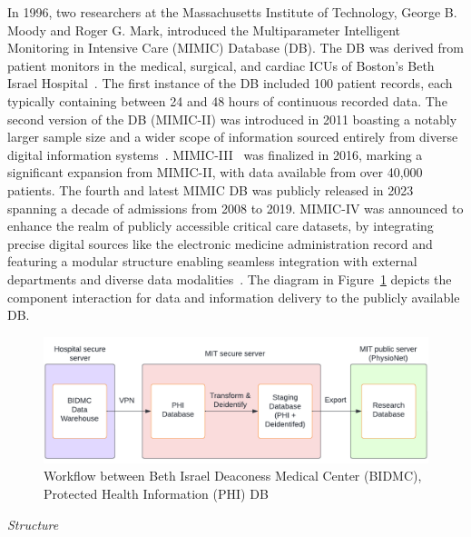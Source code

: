 In 1996, two researchers at the Massachusetts Institute of Technology, George B. Moody and Roger G. Mark, introduced the Multiparameter Intelligent Monitoring in Intensive Care (MIMIC) Database (DB).
The DB was derived from patient monitors in the medical, surgical, and cardiac ICUs of Boston’s Beth Israel Hospital~\cite{moodyDatabaseSupportDevelopment1996}.
The first instance of the DB included 100 patient records, each typically containing between 24 and 48 hours of continuous recorded data.
The second version of the DB (MIMIC-II) was introduced in 2011 boasting a notably larger sample size and a wider scope of information sourced entirely from diverse digital information systems~\cite{saeedMultiparameterIntelligentMonitoring2011}.
MIMIC-III~\cite{johnsonMIMICIIIFreelyAccessible2016} was finalized in 2016, marking a significant expansion from MIMIC-II, with data available from over 40,000 patients.
The fourth and latest MIMIC DB was publicly released in 2023 spanning a decade of admissions from 2008 to 2019.
MIMIC-IV was announced to enhance the realm of publicly accessible critical care datasets, by integrating precise digital sources like the electronic medicine administration record and featuring a modular structure enabling seamless integration with external departments and diverse data modalities~\cite{johnsonMIMICIVFreelyAccessible2023}.
The diagram in Figure~\ref{fig:mimic_workflow} depicts the component interaction for data and information delivery to the publicly available DB\@.

\begin{figure}[h]
    \centering
    \includegraphics[scale=0.6]{images/mimic/mimic_workflow}
    \caption{Workflow between Beth Israel Deaconess Medical Center (BIDMC), Protected Health Information (PHI) DB ~\cite{charltonMIMICWFDBTutorials2022}}
    \label{fig:mimic_workflow}
\end{figure}

\vspace{0.2cm}
\textit{Structure}
\vspace{0.2cm}

